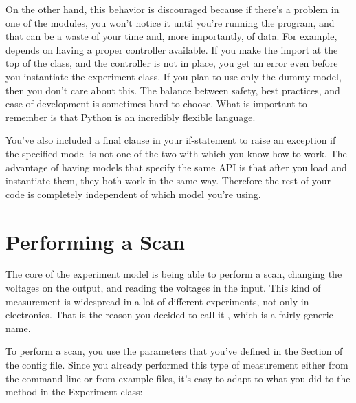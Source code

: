On the other hand, this behavior is discouraged because if there's a problem in one of the modules, you won't notice it until you're running the program, and that can be a waste of your time and, more importantly, of data. For example,  depends on having a proper controller available. If you make the import at the top of the class, and the controller is not in place, you get an error even before you instantiate the experiment class. If you plan to use only the dummy model, then you don't care about this. The balance between safety, best practices, and ease of development is sometimes hard to choose. What is important to remember is that Python is an incredibly flexible language.

You've also included a final clause in your if-statement to raise an exception if the specified model is not one of the two with which you know how to work. The advantage of having models that specify the same API is that after you load and instantiate them, they both work in the same way. Therefore the rest of your code is completely independent of which model you're using.


\section{Performing a Scan}\label{sec:doing-scan}
The core of the experiment model is being able to perform a scan, changing the voltages on the output, and reading the voltages in the input. This kind of measurement is widespread in a lot of different experiments, not only in electronics. That is the reason you decided to call it , which is a fairly generic name.


To perform a scan, you use the parameters that you've defined in the  Section of the config file. Since you already performed this type of measurement either from the command line or from example files, it's easy to adapt to what you did to the method in the Experiment class:

